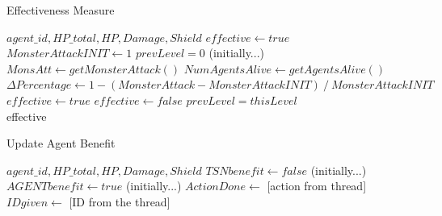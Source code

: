 
\begin{algorithm}
\caption{Effectiveness Measure}\label{alg:14}
\begin{algorithmic}
\scriptsize
\Require $agent\_id, HP\_total, HP, Damage, Shield$
\State $effective \leftarrow true$
\State $MonsterAttackINIT \leftarrow 1$
\State $prevLevel = 0$ (initially...)
\State $MonsAtt \leftarrow getMonsterAttack()$
\State $NumAgentsAlive \leftarrow getAgentsAlive()$
\State $\Delta Percentage \leftarrow 1-(MonsterAttack-MonsterAttackINIT)~/~MonsterAttackINIT$
\State $effective \leftarrow true$
\Else
\State $effective \leftarrow false$
\EndIf
\State $prevLevel = thisLevel$\\
\Return effective
\EndIf
\end{algorithmic}
\end{algorithm}



\begin{algorithm}
\caption{Update Agent Benefit}\label{alg:15}
\begin{algorithmic}
\scriptsize
\Require $agent\_id, HP\_total, HP, Damage, Shield$
\State $TSNbenefit \leftarrow false$ (initially...)
\State $AGENTbenefit \leftarrow true$ (initially...)
\State $ActionDone \leftarrow$ [action from thread]
\State $IDgiven \leftarrow$ [ID from the thread]
\end{algorithmic}
\end{algorithm}




